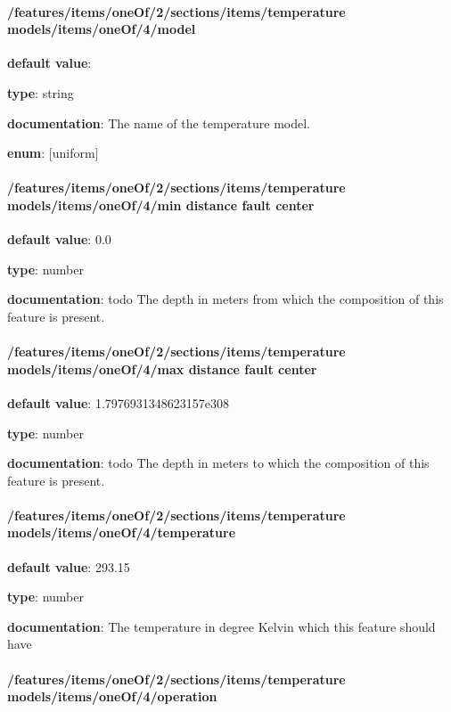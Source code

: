 \paragraph{/features/items/oneOf/2/sections/items/temperature models/items/oneOf/4/model} \begin{itemized}
\item {\bf default value}: 
\item {\bf type}: string
\item {\bf documentation}: The name of the temperature model.
\item {\bf enum}: [uniform]\end{itemized}\paragraph{/features/items/oneOf/2/sections/items/temperature models/items/oneOf/4/min distance fault center} \begin{itemized}
\item {\bf default value}: 0.0
\item {\bf type}: number
\item {\bf documentation}: todo The depth in meters from which the composition of this feature is present.
\end{itemized}\paragraph{/features/items/oneOf/2/sections/items/temperature models/items/oneOf/4/max distance fault center} \begin{itemized}
\item {\bf default value}: 1.7976931348623157e308
\item {\bf type}: number
\item {\bf documentation}: todo The depth in meters to which the composition of this feature is present.
\end{itemized}\paragraph{/features/items/oneOf/2/sections/items/temperature models/items/oneOf/4/temperature} \begin{itemized}
\item {\bf default value}: 293.15
\item {\bf type}: number
\item {\bf documentation}: The temperature in degree Kelvin which this feature should have
\end{itemized}\paragraph{/features/items/oneOf/2/sections/items/temperature models/items/oneOf/4/operation} \begin{itemized}

\end{itemized}
